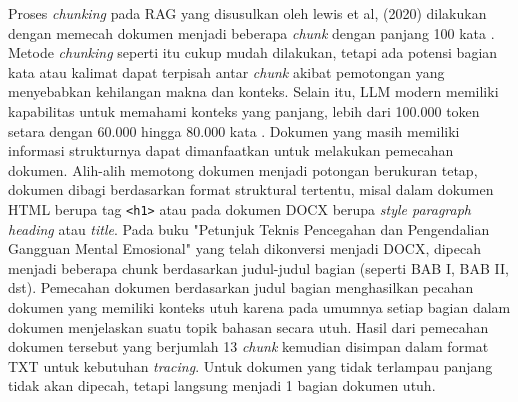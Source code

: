 Proses \textit{chunking} pada RAG yang disusulkan oleh lewis et al, (2020) dilakukan dengan memecah dokumen menjadi beberapa \textit{chunk} dengan panjang 100 kata \cite{Lewis2021RAGKnowledgeIntensiveNLP}.
Metode \textit{chunking} seperti itu cukup mudah dilakukan, tetapi ada potensi bagian kata atau kalimat dapat terpisah antar \textit{chunk} akibat pemotongan yang menyebabkan kehilangan makna dan konteks.
Selain itu, LLM modern memiliki kapabilitas untuk memahami konteks yang panjang, lebih dari 100.000 token  setara dengan 60.000 hingga 80.000 kata \cite{LLMStats}.
Dokumen yang masih memiliki informasi strukturnya dapat dimanfaatkan untuk melakukan pemecahan dokumen.
Alih-alih memotong dokumen menjadi potongan berukuran tetap, dokumen dibagi berdasarkan format struktural tertentu, misal dalam dokumen HTML berupa tag \texttt{<h1>} atau pada dokumen DOCX berupa \textit{style paragraph heading} atau \textit{title}.
Pada buku "Petunjuk Teknis Pencegahan dan Pengendalian Gangguan Mental Emosional" yang telah dikonversi menjadi DOCX, dipecah menjadi beberapa chunk berdasarkan judul-judul bagian (seperti BAB I, BAB II, dst).
Pemecahan dokumen berdasarkan judul bagian menghasilkan pecahan dokumen yang memiliki konteks utuh karena pada umumnya setiap bagian dalam dokumen menjelaskan suatu topik bahasan secara utuh.
Hasil dari pemecahan dokumen tersebut yang berjumlah 13 \textit{chunk} kemudian disimpan dalam format TXT untuk kebutuhan \textit{tracing}.
Untuk dokumen yang tidak terlampau panjang tidak akan dipecah, tetapi langsung menjadi 1 bagian dokumen utuh.

